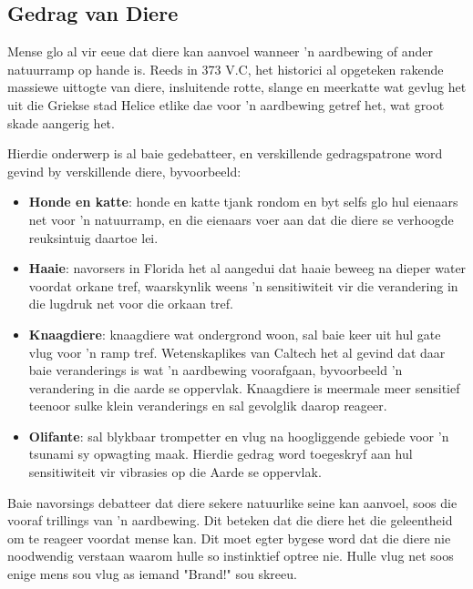     \label{m38779*eip-745}
            \subsection*{Gedrag van Diere}
            \nopagebreak
            \label{m38779*id1164126080746} Mense glo al vir eeue dat diere kan aanvoel wanneer 'n aardbewing of ander natuurramp op hande is. Reeds in 373 V.C, het historici al opgeteken rakende massiewe uittogte van diere, insluitende rotte, slange en meerkatte wat gevlug het uit die Griekse stad Helice etlike dae voor 'n aardbewing getref het, wat groot skade aangerig het.  \par 
      \label{m38779*id1164126439136} Hierdie onderwerp is al baie gedebatteer, en verskillende gedragspatrone word gevind by verskillende diere, byvoorbeeld: \par 
      \label{m38779*id1164132827593}\begin{itemize}[noitemsep]
            \item \textbf{Honde en katte}: honde en katte tjank rondom en byt selfs glo hul eienaars net voor 'n natuurramp, en die eienaars voer aan dat die diere se verhoogde reuksintuig daartoe lei.
\item \textbf{Haaie}: navorsers in Florida het al aangedui dat haaie beweeg na dieper water voordat orkane tref, waarskynlik weens 'n sensitiwiteit vir die verandering in die lugdruk net voor die orkaan tref. 
\item \textbf{Knaagdiere}: knaagdiere wat ondergrond woon, sal baie keer uit hul gate vlug voor 'n ramp tref. Wetenskaplikes van Caltech het al gevind dat daar baie veranderings is wat 'n aardbewing voorafgaan, byvoorbeeld 'n verandering in die aarde se oppervlak. Knaagdiere is meermale meer sensitief teenoor sulke klein veranderings en sal gevolglik daarop reageer. 
\item \textbf{Olifante}: sal blykbaar trompetter en vlug na hoogliggende gebiede voor 'n tsunami sy opwagting maak. Hierdie gedrag word toegeskryf aan hul sensitiwiteit vir vibrasies op die Aarde se oppervlak. \end{itemize}
      \label{m38779*id1164121170251}Baie navorsings debatteer dat diere sekere natuurlike seine kan aanvoel, soos die vooraf trillings van 'n aardbewing. Dit beteken dat die diere het die geleentheid om te reageer voordat mense kan. Dit moet egter bygese word dat die diere nie noodwendig verstaan waarom hulle so instinktief optree nie. Hulle vlug net soos enige mens sou vlug as iemand "Brand!" sou skreeu. \par 
